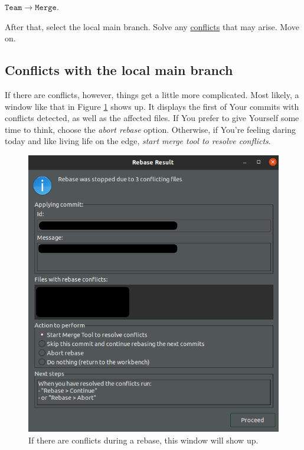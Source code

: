 \documentclass{article}
\begin{document}
$\mathtt{Team\rightarrow Merge}.$\newline

After that, select the local main branch. Solve any \hyperref[sec:conflicts]{conflicts} that may arise. Move on.

\subsection{Conflicts with the local main branch}

If there are conflicts, however, things get a little more complicated. Most likely, a window like that in Figure \ref{fig:rebase_result} shows up. It displays the first of Your commits with conflicts detected, as well as the affected files. If You prefer to give Yourself some time to think, choose the \textit{abort rebase} option. Otherwise, if You're feeling daring today and like living life on the edge, \textit{start merge tool to resolve conflicts}.

\begin{figure}[h]
    \centering
    \includegraphics[scale=0.5]{rebase_result.png}
    \caption{If there are conflicts during a rebase, this window will show up.}
    \label{fig:rebase_result}
\end{figure}
\end{document}
